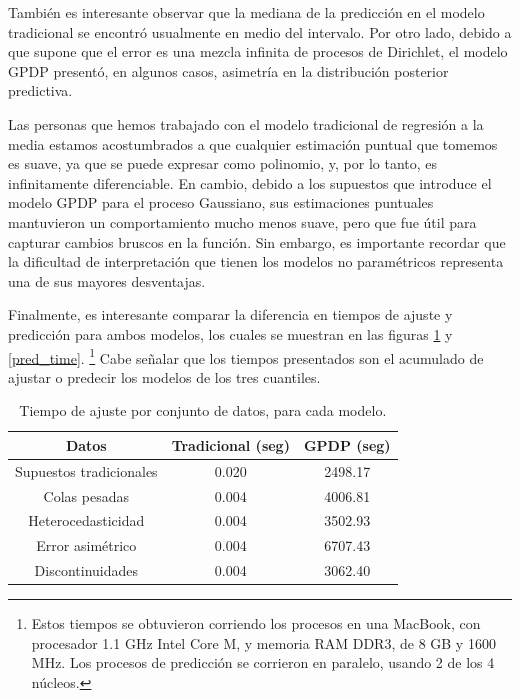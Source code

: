 Tambi\'en es interesante observar que la mediana de la predicci\'on en el modelo tradicional se encontr\'o usualmente en medio del intervalo. Por otro lado, debido a que supone que el error es una mezcla infinita de procesos de Dirichlet, el modelo GPDP present\'o, en algunos casos, asimetr\'ia en la distribuci\'on posterior predictiva.

Las personas que hemos trabajado con el modelo tradicional de regresi\'on a la media estamos acostumbrados a que cualquier estimaci\'on puntual que tomemos es suave, ya que se puede expresar como polinomio, y, por lo tanto, es infinitamente diferenciable. En cambio, debido a los supuestos que introduce el modelo GPDP para el proceso Gaussiano, sus estimaciones puntuales mantuvieron un comportamiento mucho menos suave, pero que fue \'util para capturar cambios bruscos en la funci\'on. Sin embargo, es importante recordar que la dificultad de interpretaci\'on que tienen los modelos no param\'etricos representa una de sus mayores desventajas.

Finalmente, es interesante comparar la diferencia en tiempos de ajuste y predicci\'on para ambos modelos, los cuales se muestran en las figuras \ref{fit_time} y \ref{pred_time}. \footnote{Estos tiempos se obtuvieron corriendo los procesos en una MacBook, con procesador 1.1 GHz Intel Core M, y memoria RAM DDR3, de 8 GB y 1600 MHz. Los procesos de predicci\'on se corrieron en paralelo, usando 2 de los 4 núcleos.} Cabe señalar que los tiempos presentados son el acumulado de ajustar o predecir los modelos de los tres cuantiles.

\begin{table}[H]
\centering
\caption{Tiempo de ajuste por conjunto de datos, para cada modelo.} 
\begin{tabular}{ccc}
  \hline
Datos & Tradicional (seg) & GPDP (seg) \\ 
  \hline
Supuestos tradicionales & 0.020 & 2498.17 \\ 
  Colas pesadas & 0.004 & 4006.81 \\ 
  Heterocedasticidad & 0.004 & 3502.93 \\ 
  Error asimétrico & 0.004 & 6707.43 \\ 
  Discontinuidades & 0.004 & 3062.40 \\ 
   \hline
\end{tabular}
\label{fit_time}
\end{table}

